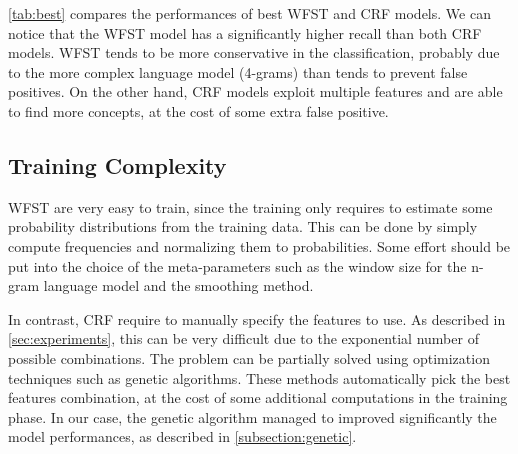 \cref{tab:best} compares the performances of best \ac{WFST} and \ac{CRF} models.
We can notice that the \ac{WFST} model has a significantly higher recall than both \ac{CRF} models.
\ac{WFST} tends to be more conservative in the classification, probably due to the more complex language model (4-grams) than tends to prevent false positives.
On the other hand, \ac{CRF} models exploit multiple features and are able to find more concepts, at the cost of some extra false positive.

\subsection{Training Complexity}
\ac{WFST} are very easy to train, since the training only requires to estimate some probability distributions from the training data.
This can be done by simply compute frequencies and normalizing them to probabilities.
Some effort should be put into the choice of the meta-parameters such as the window size for the n-gram language model and the smoothing method.

In contrast, \ac{CRF} require to manually specify the features to use.
As described in \cref{sec:experiments}, this can be very difficult due to the exponential number of possible combinations.
The problem can be partially solved using optimization techniques such as genetic algorithms.
These methods automatically pick the best features combination, at the cost of some additional computations in the training phase.
In our case, the genetic algorithm managed to improved significantly the model performances, as described in \cref{subsection:genetic}.
